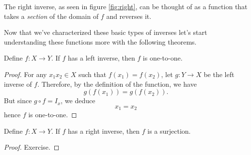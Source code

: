 The right inverse, as seen in figure \eqref{fig:right}, can be thought of as a function that takes a \textit{section} of the domain of $f$ and reverses it.
\begin{figure}[h]
\centering
{}
	\caption{}
	\label{fig:right}
\end{figure}

Now that we've characterized these basic types of inverses let's start understanding these functions more with the following theorems.

\begin{theorem}
\label{thm:left}
Define $f:X\to Y$. If $f$ has a left inverse, then $f$ is one-to-one.	
\end{theorem}
\begin{proof}
	For any $x_1 x_2\in X$ such that $f(x_1)=f(x_2)$, let $g:Y\to X$ be the left inverse of $f$. Therefore, by the definition of the function, we have
	$$g(f(x_1))=g(f(x_2)).$$
	But since $g\circ f=I_x$, we deduce
	$$x_1=x_2$$
	hence $f$ is one-to-one.
\end{proof}

\begin{theorem}
\label{thm:right}
Define $f:X\to Y$. If $f$ has a right inverse, then $f$ is a surjection.\footnotemark
\end{theorem}
\begin{proof}
Exercise.	
\end{proof}

